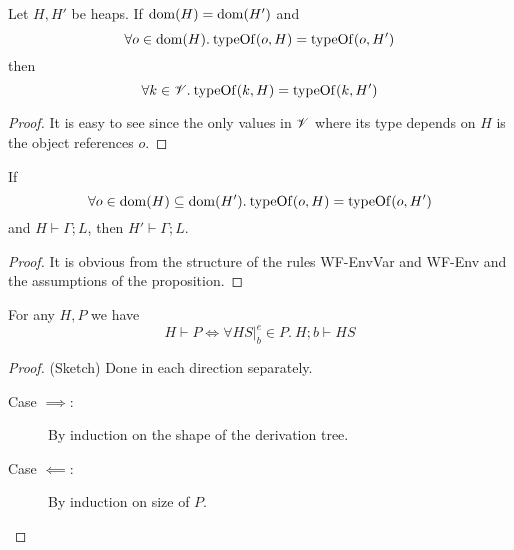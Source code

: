 \begin{proposition} \label{prop:2.12}
  Let $H, H'$ be heaps. If $\mbox{$\mathrm{dom}$}{(H)} = \mbox{$\mathrm{dom}$}{(H')}$ and
  \begin{equation*}
    \forall o \in \mbox{$\mathrm{dom}$}{(H)}. \: \mbox{$\mathrm{typeOf}$}{(o, H)} = \mbox{$\mathrm{typeOf}$}{(o, H')}
  \end{equation*}
  then 
  \begin{equation*}
    \forall k \in \mathscr{V}. \: \mbox{$\mathrm{typeOf}$}{(k, H)} = \mbox{$\mathrm{typeOf}$}{(k, H')}
  \end{equation*}
\end{proposition}

\begin{proof}
  It is easy to see since the only values in $\mathscr{V}$ where its type depends on
  $H$ is the object references $o$.
\end{proof}

\begin{proposition} \label{prop:2.19}
  If
  \begin{equation*}
    \forall o \in \mbox{$\mathrm{dom}$}(H) \subseteq \mbox{$\mathrm{dom}$}(H'). \: \mbox{$\mathrm{typeOf}$}(o, H) = \mbox{$\mathrm{typeOf}$}(o, H')
  \end{equation*}
  and $H \vdash \Gamma; L$, then $H' \vdash \Gamma; L$.
\end{proposition}

\begin{proof}
  It is obvious from the structure of the rules {\sc WF-EnvVar} and {\sc
  WF-Env} and the assumptions of the proposition.
\end{proof}

\begin{proposition} \label{prop:2.13}
  For any $H, P$ we have 
  \begin{equation}
    H \vdash P \iff \forall HS|_b^e \in P.\: H;b \vdash HS
  \end{equation}
\end{proposition}

\begin{proof} (Sketch) Done in each direction separately.
  \begin{description}
    \item[Case $\implies$:] By induction on the shape of the derivation tree.
    \item[Case $\impliedby$:] By induction on size of $P$.
  \end{description}
\end{proof}

